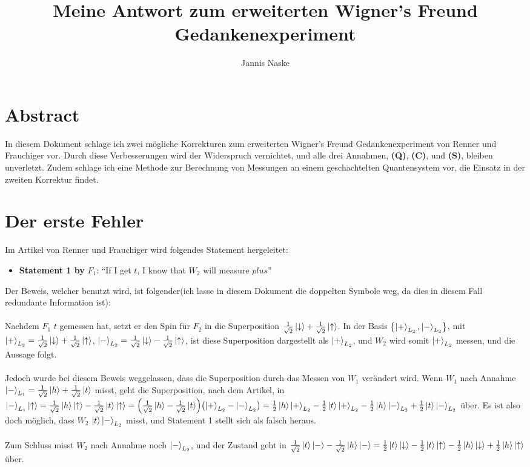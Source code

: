 \documentclass[a4paper]{article}
\title{Meine Antwort zum erweiterten Wigner's Freund Gedankenexperiment}
\author{Jannis Naske}
\begin{document}
\maketitle
\afterpage{\cfoot{\thepage}}
\section*{Abstract}
In diesem Dokument schlage ich zwei mögliche Korrekturen zum erweiterten Wigner's Freund Gedankenexperiment von Renner und Frauchiger vor.
Durch diese Verbesserungen wird der Widerspruch vernichtet, und alle drei Annahmen, \textbf{(Q)}, \textbf{(C)}, und \textbf{(S)}, bleiben unverletzt.
Zudem schlage ich eine Methode zur Berechnung von Messungen an einem geschachtelten Quantensystem vor, die Einsatz in der zweiten Korrektur findet.

\section*{Der erste Fehler}
Im Artikel von Renner und Frauchiger wird folgendes Statement hergeleitet:
\begin{itemize}
	\item \textbf{Statement 1 by} $F_1$: ``If I get $t$, I know that $W_2$ will measure $plus$''
\end{itemize}
Der Beweis, welcher benutzt wird, ist folgender(ich lasse in diesem Dokument die doppelten Symbole weg, da dies in diesem Fall redundante Information ist):\\\\
Nachdem $F_1$ $t$ gemessen hat, setzt er den Spin für $F_2$ in die Superposition $\frac{1}{\sqrt{2}} \ket{\downarrow} + \frac{1}{\sqrt{2}} \ket{\uparrow}$.
In der Basis $\qty{\ket{+}_{L_2}, \ket{-}_{L_2}}$, mit $\ket{+}_{L_2} = \frac{1}{\sqrt{2}} \ket{\downarrow} + \frac{1}{\sqrt{2}} \ket{\uparrow}$, $\ket{-}_{L_2} = \frac{1}{\sqrt{2}} \ket{\downarrow} - \frac{1}{\sqrt{2}} \ket{\uparrow}$,
ist diese Superposition dargestellt als $\ket{+}_{L_2}$, und $W_2$ wird somit $\ket{+}_{L_2}$ messen, und die Aussage folgt.\\\\
Jedoch wurde bei diesem Beweis weggelassen, dass die Superposition durch das Messen von $W_1$ verändert wird.
Wenn $W_1$ nach Annahme $\ket{-}_{L_1} = \frac{1}{\sqrt{2}}\ket{h} + \frac{1}{\sqrt{2}}\ket{t}$ misst, geht die Superposition, nach dem Artikel,
in $\ket{-}_{L_1}\ket{\uparrow} = \frac{1}{\sqrt{2}}\ket{h}\ket{\uparrow} - \frac{1}{\sqrt{2}}\ket{t}\ket{\uparrow} = \qty(\frac{1}{\sqrt{2}} \ket{h} - \frac{1}{\sqrt{2}} \ket{t})\qty(\ket{+}_{L_2} - \ket{-}_{L_2}) = \frac{1}{2}\ket{h}\ket{+}_{L_2} - \frac{1}{2}\ket{t}\ket{+}_{L_2} - \frac{1}{2}\ket{h}\ket{-}_{L_2} + \frac{1}{2}\ket{t}\ket{-}_{L_2}$ über. Es ist also doch möglich, dass $W_2$ $\ket{t}\ket{-}_{L_2}$ misst, und Statement 1 stellt sich als falsch heraus.\\\\
Zum Schluss misst $W_2$ nach Annahme noch $\ket{-}_{L_2}$, und der Zustand geht in $\frac{1}{\sqrt{2}}\ket{t}\ket{-} - \frac{1}{\sqrt{2}}\ket{h}\ket{-} = \frac{1}{2}\ket{t}\ket{\downarrow} - \frac{1}{2}\ket{t}\ket{\uparrow} - \frac{1}{2}\ket{h}\ket{\downarrow} + \frac{1}{2}\ket{h}\ket{\uparrow}$ über.
\end{document}
